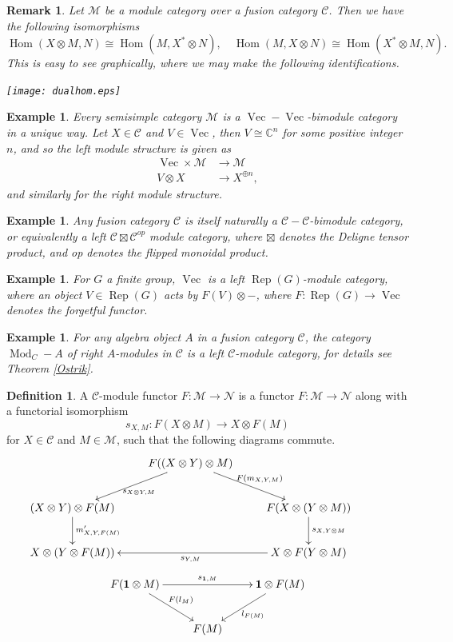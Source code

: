 \documentclass[a4paper, 10pt]{book}
\newtheorem{Expl}[theorem]{Example}
\newtheorem{Rem}[theorem]{Remark}
\theoremstyle{definition}
\newtheorem{Def}[theorem]{Definition}
\numberwithin{equation}{chapter}
\newcommand\ot{\otimes}
\newcommand\Rep{\operatorname{Rep}}
\newcommand\Vect{\operatorname{Vec}}
\newcommand\Hom{\operatorname{Hom}}
\newcommand\Mod{\operatorname{Mod}}
\newcommand\kk{\mathbb C}
\newcommand\M{\mathcal{M}}
\newcommand\NN{\mathcal{N}}
\newcommand\C{\mathcal C}
\newcommand{\ra}\rightarrow
\newcommand\one{\mathbf{1}}
\begin{document}
\begin{Rem}\rm
Let $\M$ be a module category over a fusion category $\C$. Then we have the following isomorphisms \begin{equation*}
	\Hom(X\ot M, N)\cong \Hom(M, X^*\ot N), \quad \Hom(M, X\ot N)\cong \Hom(X^*\ot M, N).
\end{equation*}
This is easy to see graphically, where we may make the following identifications.

\begin{center}
\texttt{[image: dualhom.eps]}
\end{center}

\end{Rem}

\begin{Expl}\rm
Every semisimple category $\M$ is a $\Vect-\Vect$-bimodule category in a unique way. Let $X\in \C$ and $V \in \Vect$, then $V\cong \kk^n$ for some positive integer $n$, and so the left module structure is given as\begin{align}
	\Vect \times \M & 	\ra \M\\
	V\otimes X & 	\ra X^{\oplus n},
\end{align} and similarly for the right module structure.
\end{Expl}
\begin{Expl}\rm
Any fusion category $\C$ is itself naturally a $\C-\C$-bimodule category, or equivalently a left $\C \boxtimes \C^{op}$ module category, where $\boxtimes$ denotes the Deligne tensor product, and \textit{op} denotes the flipped monoidal product.
\end{Expl}
\begin{Expl}\rm
For $G$ a finite group, $\Vect$ is a left $\Rep(G)$-module category, where an object $V\in \Rep(G)$ acts by $F(V)\otimes -$, where $F:\Rep(G)\rightarrow \Vect$ denotes the forgetful functor. 
\end{Expl}
\begin{Expl}\rm
For any algebra object $A$ in a fusion category  $\C$, the category $\Mod_C-A$ of right $A$-modules in $\C$ is a left $\C$-module category, for details see Theorem \ref{Ostrik}.
\end{Expl}
\begin{Def}
A $\C$-module functor $F:\M\rightarrow \NN$ is a functor $F:\M\rightarrow \NN$ along with a functorial isomorphism \begin{equation*}
	s_{X, M}: F(X\otimes M) \rightarrow X\otimes F(M)  
\end{equation*} for $X\in \C$ and $M\in \M$, such that the following diagrams commute. 
\[
\xymatrix{
& F((X\ot Y) \ot M) \ar[rd]^{F(m_{X, Y, M})} \ar[ld]^{s_{X\ot Y, M}}& \\
(X\ot Y) \ot F(M) \ar[d]^{m'_{X, Y, F(M)}} & &  F(X \ot (Y\ot M))\ar[d]^{s_{X, Y\ot M}} & \\
X\ot (Y \ot F(M))& & X \ot F(Y\ot M)\ar[ll]^{s_{Y, M}} }
\]
\[
\xymatrix{F(\one\ot M) \ar[rr]^{s_{\one, M}} \ar[rd]^{F(l_M)}& &  \one \ot F(M)\ar[ld]^{l_{F(M)}}\\
& F(M) & }
\]
\end{Def}
\end{document}

